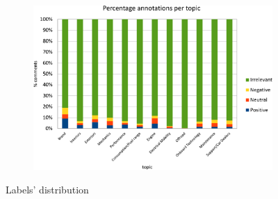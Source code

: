 \begin{figure}[ht]
	\centering
	\begin{subfigure}{.9\textwidth} %
		\includegraphics[width=1\textwidth]{figures/charts/annotations-distribution-perc-pdf2.pdf}
		\label{fig:annotations-distribution-perc}
	\end{subfigure}
	\caption{Labels' distribution} %
	\label{fig:annotations}
\end{figure}

